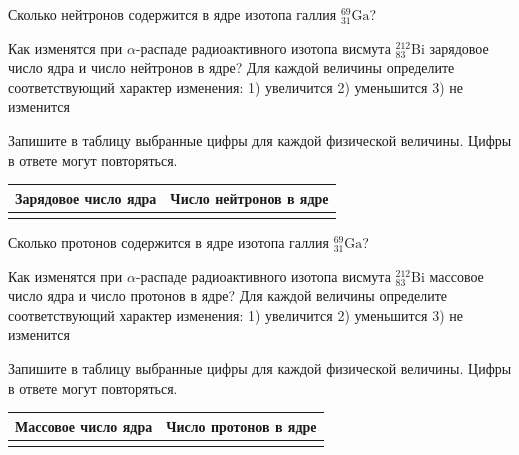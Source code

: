 \begin{taskbasic}[code={\label{task:nuclear_neutrons_gallium}}]
Сколько нейтронов содержится в ядре изотопа галлия $^{69}_{31}\text{Ga}$?

\end{taskbasic}

\begin{taskbasic}[code={\label{task:nuclear_alpha_bismuth_charge_neutrons}}]
Как изменятся при $\alpha$-распаде радиоактивного изотопа висмута $^{212}_{83}\text{Bi}$ зарядовое число ядра и число нейтронов в ядре? Для каждой величины определите соответствующий характер изменения:
1) увеличится
2) уменьшится
3) не изменится

Запишите в таблицу выбранные цифры для каждой физической величины. Цифры в ответе могут повторяться.

\nopagebreak\smallskip
\begin{center}
\small
\begin{tabular}{|c|c|}
\hline
Зарядовое число ядра & Число нейтронов в ядре \\ \hline
 & \\ \hline
\end{tabular}
\end{center}

\end{taskbasic}

\begin{taskbasic}[code={\label{task:nuclear_protons_gallium}}]
Сколько протонов содержится в ядре изотопа галлия $^{69}_{31}\text{Ga}$?

\end{taskbasic}

\begin{taskbasic}[code={\label{task:nuclear_alpha_bismuth_mass_protons}}]
Как изменятся при $\alpha$-распаде радиоактивного изотопа висмута $^{212}_{83}\text{Bi}$ массовое число ядра и число протонов в ядре? Для каждой величины определите соответствующий характер изменения:
1) увеличится
2) уменьшится
3) не изменится

Запишите в таблицу выбранные цифры для каждой физической величины. Цифры в ответе могут повторяться.

\nopagebreak\smallskip
\begin{center}
\small
\begin{tabular}{|c|c|}
\hline
Массовое число ядра & Число протонов в ядре \\ \hline
 & \\ \hline
\end{tabular}
\end{center}

\end{taskbasic}

